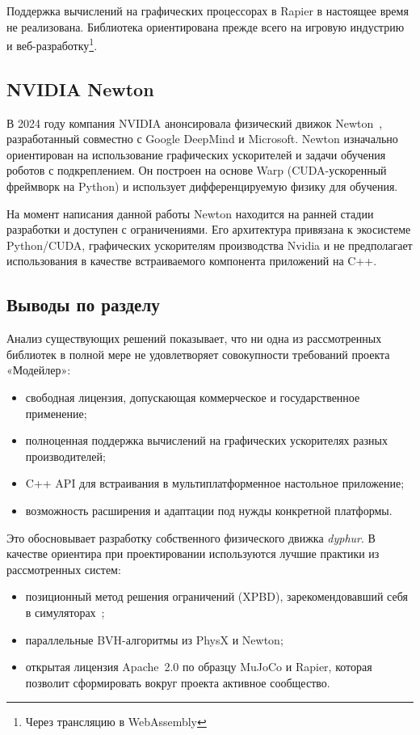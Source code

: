 Поддержка вычислений на графических процессорах в Rapier в настоящее время не реализована. Библиотека 
ориентирована прежде всего на игровую индустрию и веб-разработку\footnote{Через трансляцию в WebAssembly}.

\subsection{NVIDIA Newton}

В 2024 году компания NVIDIA анонсировала физический движок Newton~\cite{nvidia2024newton}, разработанный 
совместно с Google DeepMind и Microsoft. Newton изначально ориентирован на использование графических 
ускорителей и задачи обучения роботов с подкреплением. Он построен на основе Warp (CUDA-ускоренный фреймворк 
на Python) и использует дифференцируемую физику для обучения.

На момент написания данной работы Newton находится на ранней стадии разработки и доступен с ограничениями. Его 
архитектура привязана к экосистеме Python/CUDA, графических ускорителям производства Nvidia и не предполагает 
использования в качестве встраиваемого компонента приложений на C++.

\subsection{Выводы по разделу}

Анализ существующих решений показывает, что ни одна из рассмотренных библиотек в полной мере не удовлетворяет 
совокупности требований проекта «Модейлер»:

\begin{itemize}
  \item свободная лицензия, допускающая коммерческое и государственное применение;
  \item полноценная поддержка вычислений на графических ускорителях разных производителей;
  \item C++ API для встраивания в мультиплатформенное настольное приложение;
  \item возможность расширения и адаптации под нужды конкретной платформы.
\end{itemize}

Это обосновывает разработку собственного физического движка \textit{dyphur}. В качестве ориентира при 
проектировании используются лучшие практики из рассмотренных систем:

\begin{itemize}
  \item позиционный метод решения ограничений (XPBD), зарекомендовавший себя в 
        симуляторах~\cite{macklin2016xpbd};
  \item параллельные BVH-алгоритмы из PhysX и Newton;
  \item открытая лицензия Apache~2.0 по образцу MuJoCo и Rapier, которая позволит сформировать вокруг проекта активное 
  сообщество.
\end{itemize}
